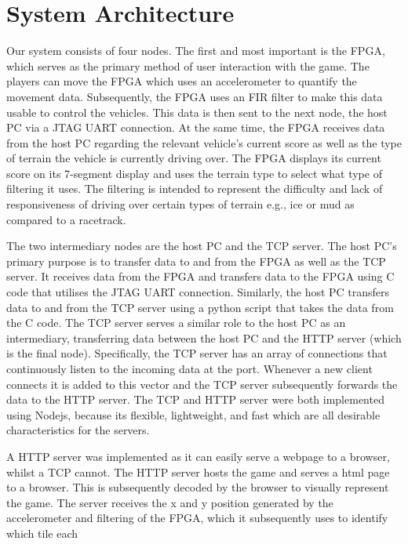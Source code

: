 \documentclass[12pt,a4paper]{article}
\begin{document}
\section{\normalsize System Architecture}

{\small Our system consists of four nodes. The first and most important is the 
FPGA, which serves as the primary method of user interaction with the 
game. The players can move the FPGA which uses an accelerometer to quantify 
the movement data. Subsequently, the FPGA uses an FIR filter to make this 
data usable to control the vehicles. This data is then sent to the next node, 
the host PC via a JTAG UART connection. At the same time, the FPGA receives 
data from the host PC regarding the relevant vehicle’s current score as well 
as the type of terrain the vehicle is currently driving over. The FPGA displays 
its current score on its 7-segment display and uses the terrain type to select 
what type of filtering it uses. The filtering is intended to represent the 
difficulty and lack of responsiveness of driving over certain types of terrain 
e.g., ice or mud as compared to a racetrack.
\par
The two intermediary nodes are the host PC and the TCP server. The host PC’s 
primary purpose is to transfer data to and from the FPGA as well as the TCP 
server. It receives data from the FPGA and transfers data to the FPGA using 
C code that utilises the JTAG UART connection. Similarly, the host PC transfers 
data to and from the TCP server using a python script that takes the data from 
the C code. The TCP server serves a similar role to the host PC as an intermediary, 
transferring data between the host PC and the HTTP server (which is the final node). 
Specifically, the TCP server has an array of connections that continuously listen 
to the incoming data at the port. Whenever a new client connects it is added to 
this vector and the TCP server subsequently forwards the data to the HTTP server. 
The TCP and HTTP server were both implemented using Nodejs, because its flexible, 
lightweight, and fast which are all desirable characteristics for the servers.   
\par
A HTTP server was implemented as it can easily serve a webpage to a browser, 
whilst a TCP cannot. The HTTP server hosts the game and serves a html page to 
a browser. This is subsequently decoded by the browser to visually represent 
the game. The server receives the x and y position generated by the accelerometer 
and filtering of the FPGA, which it subsequently uses to identify which tile each 
}
\end{document}
